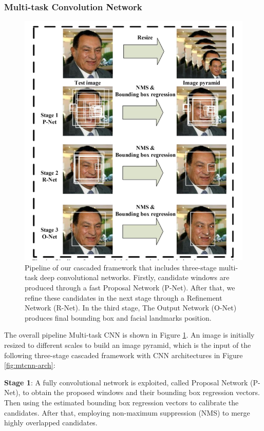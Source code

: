 \documentclass[journal, twocolumn]{IEEEtran}
\begin{document}
\subsubsection{Multi-task Convolution Network}
\begin{figure}
    \centering
    \includegraphics[width=1\linewidth]{img/mtcnn.png}
	\caption{Pipeline of our cascaded framework that includes three-stage multi-task deep convolutional networks. Firstly, candidate windows are produced
through a fast Proposal Network (P-Net). After that, we refine these candidates
in the next stage through a Refinement Network (R-Net). In the third stage,
The Output Network (O-Net) produces final bounding box and facial landmarks position.}\label{fig:mtcnn}
\end{figure}

The overall pipeline Multi-task CNN is shown in Figure \ref{fig:mtcnn}. An image is  initially resized to different scales to build an image pyramid, which is the input of the following three-stage cascaded framework with CNN architectures in Figure \ref{fig:mtcnn-arch}:

\textbf{Stage 1}: A fully convolutional network is exploited, called Proposal Network (P-Net), to obtain the proposed windows and their bounding box regression vectors. Then using the estimated bounding box regression vectors to calibrate the candidates. After that, employing non-maximum suppression (NMS) to merge highly overlapped candidates.
\end{document}
